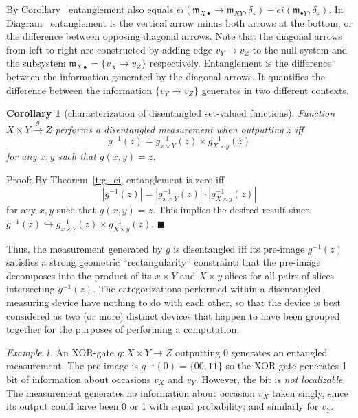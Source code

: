 \documentclass[12pt]{article}
\newcommand{\eop}{{$\blacksquare$}}
\newcommand{\fm}{{\mathfrak m}}
\newtheorem{cor}[thm]{Corollary}
\theoremstyle{remark}
\newtheorem{eg}{Example}
\begin{document}
By Corollary~%
entanglement also equals $ei(\fm_{X\bullet}\rightarrow 
\fm_{XY},\delta_z)-ei(\fm_{\bullet Y},\delta_z)$. In 
Diagram~%
entanglement is the vertical arrow minus both arrows at the 
bottom, or the difference between opposing diagonal arrows. 
Note that the diagonal arrows from left to right are 
constructed by adding edge $v_Y\rightarrow v_Z$ to the null 
system and the subsystem $\fm_{X\bullet}=
\{v_X\rightarrow v_Z\}$ respectively.  Entanglement is the 
difference between the information generated by the diagonal 
arrows. It quantifies the difference between the information 
$\{v_Y\rightarrow v_Z\}$ generates in two different contexts.

\begin{cor}
    [characterization of disentangled set-valued functions]
	\label{t:g0z}
	Function $X\times Y\xrightarrow{g}Z$ performs a 
    disentangled measurement when outputting $z$ iff
	\begin{equation*}
		g^{-1}(z)=g^{-1}_{x\times Y}(z)\times 
        g^{-1}_{X\times y}(z)
	\end{equation*}
	for any $x,y$ such that $g(x,y)=z$.
\end{cor}

\noindent
Proof:
By Theorem~\ref{t:g_ei} entanglement is zero iff
\begin{equation*}
	|g^{-1}(z)|=|g^{-1}_{x\times Y}(z)|\cdot 
    |g^{-1}_{X\times y}(z)|
\end{equation*}
for any $x,y$ such that $g(x,y)=z$. This implies the desired 
result since $g^{-1}(z)\hookrightarrow g^{-1}_{x\times Y}(z)
\times g^{-1}_{X\times y}(z)$.
\eop

Thus, the measurement generated by $g$ is disentangled iff its 
pre-image $g^{-1}(z)$ satisfies a strong geometric 
``rectangularity'' constraint: that the pre-image decomposes 
into the product of its $x\times Y$ and $X\times y$ slices for 
all pairs of slices intersecting $g^{-1}(z)$. The 
categorizations performed within a disentangled measuring 
device have nothing to do with each other, so that the device 
is best considered as two (or more) distinct devices that 
happen to have been grouped together for the purposes of 
performing a computation.

\begin{eg}
	An XOR-gate $g:X\times Y\rightarrow Z$ outputting 0 
    generates an entangled measurement. The pre-image is 
    $g^{-1}(0)=\{00,11\}$ so the XOR-gate generates 1 bit 
    of information about occasions $v_X$ and $v_Y$. However, 
    the bit is \emph{not localizable}. The measurement 
    generates no information about occasion $v_X$ taken singly,
    since its output could have been 0 or 1 with equal 
    probability; and similarly for $v_Y$.
\end{eg}
\end{document}
